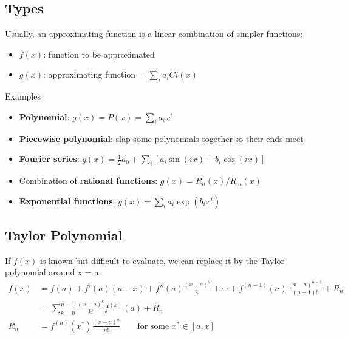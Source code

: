 \documentclass[12pt]{article}
\begin{document}
\subsection{Types}
Usually, an approximating function is a linear combination of
simpler functions:
%
\begin{itemize}
\item $f(x)$: function to be approximated
\item $g(x)$: approximating function = $\sum_i a_i Ci(x)$
\end{itemize}
%
Examples
%
\begin{itemize}
\item \textbf{Polynomial}: $g(x) = P(x) = \sum_i a_i x^i$

\item \textbf{Piecewise polynomial}: slap some polynomials together so their ends meet

\item \textbf{Fourier series}: $g(x) = \frac{1}{2} a_0 + \sum_i [a_i \sin(ix) + b_i \cos(ix)]$ %

\item Combination of \textbf{rational functions}: $g(x) = R_n(x)/R_m(x)$

\item \textbf{Exponential functions}: $g(x) = \sum_i a_i \exp(b_i x^i)$
\end{itemize}

\subsection{Taylor Polynomial}
If $f(x)$ is known but difficult to evaluate, we can replace it by the
Taylor polynomial around x = a
\begin{align}
f(x) &= f(a) + f'(a)(a-x) + f''(a)\frac{(x-a)^2}{2!} + \cdots + f^{(n-1)}(a)\frac{(x-a)^{n-1}}{(n-1)!} + R_n \\
%
  &= \sum_{k=0}^{n-1}\frac{(x-a)^k}{k!}f^{(k)}(a) + R_n \\
%
R_n &= f^{(n)}(x^*)\frac{(x-a)^{n}}{n!} \qquad \text{for some } x^* \in [a, x]
\end{align}
\end{document}
